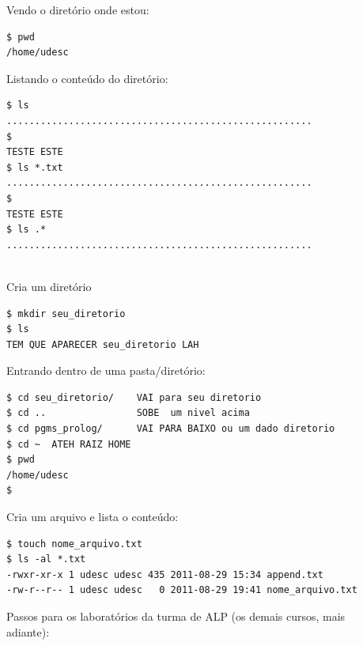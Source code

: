 \documentclass[final,a4paper]{article}
\begin{document}
\begin{description}


\item[] Vendo o diretório onde estou:
\begin{verbatim}
$ pwd
/home/udesc
\end{verbatim}


\pagebreak
\item[] Listando o conteúdo do diretório:
\begin{verbatim}
$ ls
......................................................
$ 
TESTE ESTE
$ ls *.txt
......................................................
$ 
TESTE ESTE
$ ls .*
......................................................


\end{verbatim}







\pagebreak
\item[] Cria um diretório
\begin{verbatim}
$ mkdir seu_diretorio
$ ls    
TEM QUE APARECER seu_diretorio LAH
\end{verbatim}


\pagebreak
\item[] Entrando dentro de uma pasta/diretório:
\begin{verbatim}
$ cd seu_diretorio/    VAI para seu diretorio
$ cd ..                SOBE  um nivel acima
$ cd pgms_prolog/      VAI PARA BAIXO ou um dado diretorio
$ cd ~  ATEH RAIZ HOME
$ pwd
/home/udesc
$ 
\end{verbatim}



\pagebreak
\item[] Cria um arquivo e lista o conteúdo:
\begin{verbatim}
$ touch nome_arquivo.txt
$ ls -al *.txt
-rwxr-xr-x 1 udesc udesc 435 2011-08-29 15:34 append.txt
-rw-r--r-- 1 udesc udesc   0 2011-08-29 19:41 nome_arquivo.txt
\end{verbatim}


\pagebreak
\item[] Passos para os laboratórios da turma de ALP (os demais cursos, mais adiante):


\begin{enumerate}

 \setlength\itemsep{13pt}


\end{enumerate}
\end{description}
\end{document}
